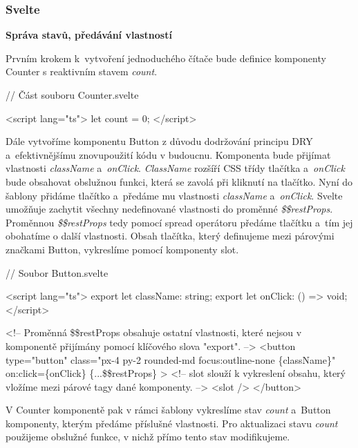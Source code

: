 \subsubsection{Svelte}

\begin{flushleft}
  \textbf{Správa stavů, předávání vlastností}
\end{flushleft}

Prvním krokem k~vytvoření jednoduchého čítače bude definice komponenty Counter s reaktivním stavem \emph{count}.

\begin{prog}
// Část souboru Counter.svelte

<script lang="ts">
  let count = 0;
</script>
\end{prog}

Dále vytvoříme komponentu Button z důvodu dodržování principu DRY a~efektivnějšímu znovupoužití kódu v budoucnu.
Komponenta bude přijímat vlastnosti \emph{className} a~\emph{onClick}. \emph{ClassName} rozšíří CSS třídy tlačítka a~\emph{onClick} bude obsahovat obslužnou funkci, která se zavolá při kliknutí na tlačítko.
Nyní do šablony přidáme tlačítko a~předáme mu vlastnosti \emph{className} a~\emph{onClick}.
Svelte umožňuje zachytit všechny nedefinované vlastnosti do proměnné \emph{\$\$restProps}. Proměnnou \emph{\$\$restProps} tedy pomocí spread operátoru předáme tlačítku a~tím jej obohatíme o další vlastnosti. 
Obsah tlačítka, který definujeme mezi párovými značkami Button, vykreslíme pomocí komponenty slot.

\begin{prog}
// Soubor Button.svelte

<script lang="ts">
  export let className: string;
  export let onClick: () => void;
</script>

<!-- Proměnná \$\$restProps obsahuje ostatní vlastnosti, 
  které nejsou v komponentě přijímány pomocí klíčového slova "export". -->
<button
  type="button"
  class="px-4 py-2 rounded-md focus:outline-none \{className\}"
  on:click=\{onClick\}
  \{...\$\$restProps\}
>
  <!-- slot slouží k vykreslení obsahu, 
    který vložíme mezi párové tagy dané komponenty. -->
  <slot />
</button>
\end{prog}

V Counter komponentě pak v rámci šablony vykreslíme stav \emph{count} a~Button komponenty, kterým předáme příslušné vlastnosti. 
Pro aktualizaci stavu \emph{count} použijeme obslužné funkce, v nichž přímo tento stav modifikujeme.

